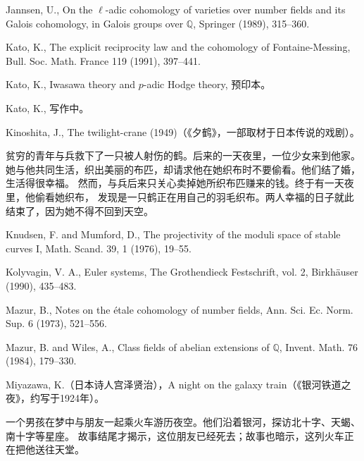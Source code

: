 \begin{description}[style=nextline,leftmargin=3.7em,labelwidth=3.2em,font=\normalfont\small,itemsep=.6em]
\item[{[Ja]}] Jannsen, U., On the $\ell$-adic cohomology of varieties over number fields and its Galois cohomology, in Galois groups over $\mathbb Q$, Springer (1989), 315--360.
\item[{[Ka1]}] Kato, K., The explicit reciprocity law and the cohomology of Fontaine-Messing, Bull. Soc. Math. France 119 (1991), 397--441.
\item[{[Ka2]}] Kato, K., Iwasawa theory and $p$-adic Hodge theory, 预印本。
\item[{[Ka3]}] Kato, K., 写作中。
\item[{[Ki]}] Kinoshita, J., The twilight-crane (1949)（《夕鹤》，一部取材于日本传说的戏剧）。

贫穷的青年与兵救下了一只被人射伤的鹤。后来的一天夜里，一位少女来到他家。
她与他共同生活，织出美丽的布匹，却请求他在她织布时不要偷看。他们结了婚，生活得很幸福。
然而，与兵后来只关心卖掉她所织布匹赚来的钱。终于有一天夜里，他偷看她织布，
发现是一只鹤正在用自己的羽毛织布。两人幸福的日子就此结束了，因为她不得不回到天空。
\item[{[KM]}] Knudsen, F. and Mumford, D., The projectivity of the moduli space of stable curves I, Math. Scand. 39, 1 (1976), 19--55.
\item[{[Ko]}] Kolyvagin, V. A., Euler systems, The Grothendieck Festschrift, vol. 2, Birkhäuser (1990), 435--483.
\item[{[Ma]}] Mazur, B., Notes on the étale cohomology of number fields, Ann. Sci. Ec. Norm. Sup. 6 (1973), 521--556.
\item[{[MW]}] Mazur, B. and Wiles, A., Class fields of abelian extensions of $\mathbb Q$, Invent. Math. 76 (1984), 179--330.
\item[{[Mi]}] Miyazawa, K.（日本诗人宫泽贤治），A night on the galaxy train（《银河铁道之夜》，约写于1924年）。

一个男孩在梦中与朋友一起乘火车游历夜空。他们沿着银河，探访北十字、天蝎、南十字等星座。
故事结尾才揭示，这位朋友已经死去；故事也暗示，这列火车正在把他送往天堂。


\end{description}
